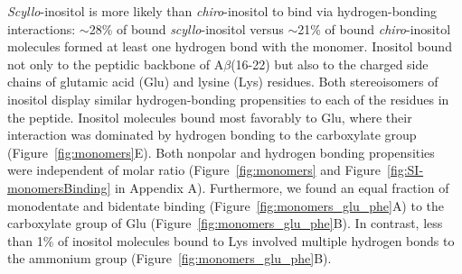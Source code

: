 \emph{Scyllo}-inositol is more likely than \emph{chiro}-inositol to bind via hydrogen-bonding interactions: $\sim$28\% of bound \emph{scyllo}-inositol versus $\sim$21\% of bound \emph{chiro}-inositol molecules formed at least one hydrogen bond with the monomer. Inositol bound not only to the peptidic backbone of A$\beta$(16-22) but also to the charged side chains of glutamic acid (Glu) and lysine (Lys) residues. Both stereoisomers of inositol display similar hydrogen-bonding propensities to each of the residues in the peptide. %
Inositol molecules bound most favorably to Glu, where their interaction was dominated by hydrogen bonding to the carboxylate group (Figure~\ref{fig:monomers}E). Both nonpolar and hydrogen bonding propensities were independent of molar ratio (Figure~{\ref{fig:monomers}} and Figure~{\ref{fig:SI-monomersBinding}} in Appendix A). 
Furthermore, we found an equal fraction of monodentate and bidentate binding (Figure~\ref{fig:monomers_glu_phe}A) to the carboxylate group of Glu (Figure~\ref{fig:monomers_glu_phe}B). In contrast, less than 1\% of inositol molecules bound to Lys involved multiple hydrogen bonds to the ammonium group (Figure~\ref{fig:monomers_glu_phe}B).

